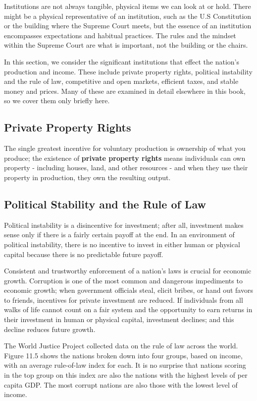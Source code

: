 \documentclass[11pt]{article} %
\begin{document}
Institutions are not always tangible, physical items we can look at or hold. There might be a physical representative of an institution, such as the U.S Constitution or the building where the Supreme Court meets, but the essence of an institution encompasses expectations and habitual practices. The rules and the mindset within the Supreme Court are what is important, not the building or the chairs.

In this section, we consider the significant institutions that effect the nation's production and income. These include private property rights, political instability and the rule of law, competitive and open markets, efficient taxes, and stable money and prices. Many of these are examined in detail elsewhere in this book, so we cover them only briefly here.

\subsection*{Private Property Rights}

The single greatest incentive for voluntary production is ownership of what you produce; the existence of \textbf{private property rights} means individuals can own property - including houses, land, and other resources - and when they use their property in production, they own the resulting output.

\subsection*{Political Stability and the Rule of Law}

Political instability is a disincentive for investment; after all, investment makes sense only if there is a fairly certain payoff at the end. In an environment of political instability, there is no incentive to invest in either human or physical capital because there is no predictable future payoff.

Consistent and trustworthy enforcement of a nation's laws is crucial for economic growth. Corruption is one of the most common and dangerous impediments to economic growth; when government officials steal, elicit bribes, or hand out favors to friends, incentives for private investment are reduced. If individuals from all walks of life cannot count on a fair system and the opportunity to earn returns in their investment in human or physical capital, investment declines; and this decline reduces future growth.

The World Justice Project collected data on the rule of law across the world. Figure 11.5 shows the nations broken down into four groups, based on income, with an average rule-of-law index for each. It is no surprise that nations scoring in the top group on this index are also the nations with the highest levels of per capita GDP. The most corrupt nations are also those with the lowest level of income.
\end{document}
